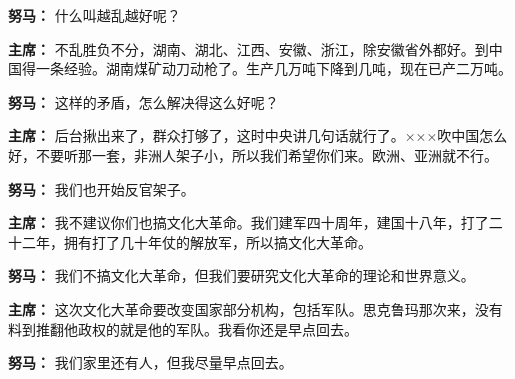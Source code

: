 \begin{list}{}
\item[\textbf{努马：}] 什么叫越乱越好呢？

\item[\textbf{主席：}] 不乱胜负不分，湖南、湖北、江西、安徽、浙江，除安徽省外都好。到中国得一条经验。湖南煤矿动刀动枪了。生产几万吨下降到几吨，现在已产二万吨。

\item[\textbf{努马：}] 这样的矛盾，怎么解决得这么好呢？

\item[\textbf{主席：}] 后台揪出来了，群众打够了，这时中央讲几句话就行了。×××吹中国怎么好，不要听那一套，非洲人架子小，所以我们希望你们来。欧洲、亚洲就不行。

\item[\textbf{努马：}] 我们也开始反官架子。

\item[\textbf{主席：}] 我不建议你们也搞文化大革命。我们建军四十周年，建国十八年，打了二十二年，拥有打了几十年仗的解放军，所以搞文化大革命。

\item[\textbf{努马：}] 我们不搞文化大革命，但我们要研究文化大革命的理论和世界意义。

\item[\textbf{主席：}] 这次文化大革命要改变国家部分机构，包括军队。思克鲁玛那次来，没有料到推翻他政权的就是他的军队。我看你还是早点回去。

\item[\textbf{努马：}] 我们家里还有人，但我尽量早点回去。
\end{list}
